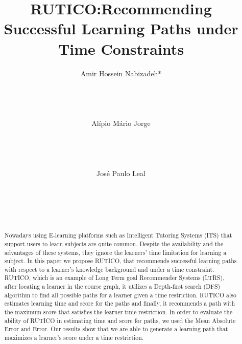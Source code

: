 \documentclass{sig-alternate}
\begin{document}
\title{RUTICO:Recommending Successful Learning Paths under Time Constraints}
\author{
\alignauthor
Amir Hossein Nabizadeh* \\
       \\
       \\
       \\
       \\
\alignauthor
Alípio Mário Jorge\\
       \\
       \\
       \\
       \\
\alignauthor
José Paulo Leal\\
       \\
       \\
       \\
       \\
}
\maketitle

\begin{abstract}
    Nowadays using E-learning platforms such as Intelligent Tutoring Systems (ITS) that support users to learn subjects are quite common. Despite the availability and the advantages of these systems, they ignore the learners’ time limitation for learning a subject. In this paper we propose RUTICO, that recommends successful learning paths with respect to a learner’s knowledge background and under a time constraint. RUTICO, which is an example of Long Term goal Recommender Systems (LTRS), after locating a learner in the course graph, it utilizes a Depth-first search (DFS) algorithm to find all possible paths for a learner given a time restriction. RUTICO also estimates learning time and score for the paths and finally, it recommends a path with the maximum score that satisfies the learner time restriction. In order to evaluate the ability of RUTICO in estimating time and score for paths, we used the Mean Absolute Error and Error. Our results show that we are able to generate a learning path that maximizes a learner’s score under a time restriction.
\end{abstract}
\end{document}
